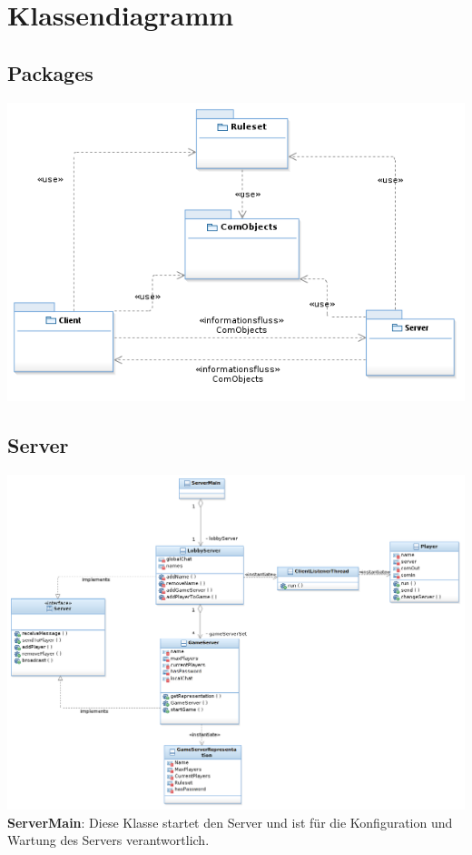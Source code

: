\documentclass{article}
\begin{document}
\section{Klassendiagramm}

\subsection{Packages}
\includegraphics[width=\textwidth]{Packages}

\subsection{Server}
\includegraphics[width=\textwidth]{Entwurf_ServerDiagram}
\textbf{ServerMain}: Diese Klasse startet den Server und ist für die Konfiguration und Wartung des Servers verantwortlich. \\
\end{document}
